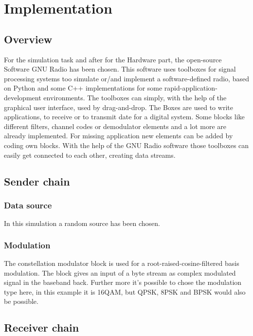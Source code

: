
\chapter{Implementation}

\section{Overview}

For the simulation task and after for the Hardware part, the open-source Software GNU Radio has been chosen. This software uses toolboxes for signal processing systems too simulate or/and implement a software-defined radio, based on Python and some C++ implementations for some rapid-application-development environments. The toolboxes can simply, with the help of the graphical user interface, used by drag-and-drop. The Boxes are used to write applications, to receive or to transmit date for a digital system. Some blocks like different filters, channel codes or demodulator elements and a lot more are already implemented. For missing application new elements can be added by coding own blocks. With the help of the GNU Radio software those toolboxes can easily get connected to each other, creating data streams. 

\section{Sender chain}
\subsection{Data source}

In this simulation a random source has been chosen.

\subsection{Modulation}

The constellation modulator block is used for a root-raised-cosine-filtered basis modulation. The block gives an input of a byte stream as complex modulated signal in the baseband back. 
Further more it's possible to chose the modulation type here, in this example it is 16QAM, but QPSK, 8PSK and BPSK would also be possible.

\section{Receiver chain}


